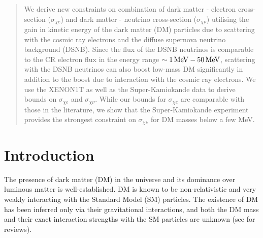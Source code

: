 \documentclass[11pt,prd,twocolumn,nofootinbib,reprint,superscriptaddress,longbibliography,colorlinks=true,citecolor=blue]{revtex4-1}
\begin{document}
\begin{abstract}
We derive new constraints on combination of dark matter - electron cross-section ($\sigma_{\chi e}$) and dark matter - neutrino cross-section ($\sigma_{\chi \nu}$) utilising
the gain in kinetic energy of the dark matter (DM) particles due to scattering with the cosmic ray electrons and the diffuse supernova neutrino background (DSNB). Since the flux
of the DSNB neutrinos is comparable to the CR electron flux in the energy range $\sim 1\,{\rm MeV}  - 50 \,{\rm MeV}$, scattering with the
DSNB neutrinos can also boost low-mass DM significantly in addition to the boost due to  interaction with the cosmic ray electrons. We use the XENON1T as well as the
Super-Kamiokande data to derive bounds on $\sigma_{\chi e}$ and  $\sigma_{\chi \nu}$. While our bounds for $\sigma_{\chi e}$ are comparable with those in the literature, we show that the Super-Kamiokande experiment provides the  strongest constraint on $\sigma_{\chi \nu}$ for DM masses below a few MeV.

\end{abstract}
\maketitle

\section{Introduction}
The presence of dark matter (DM) in the universe and its dominance over luminous matter is well-established. DM is known to be non-relativistic and very weakly interacting
with the Standard Model (SM) particles. The existence of DM has been inferred only via their gravitational interactions, and both the DM mass and
their exact interaction strengths with the SM particles are unknown (see \cite{Bauer:2017qwy,Bertone:2004pz,Lisanti:2016jxe,Profumo:2013yn} for reviews).
\end{document}
